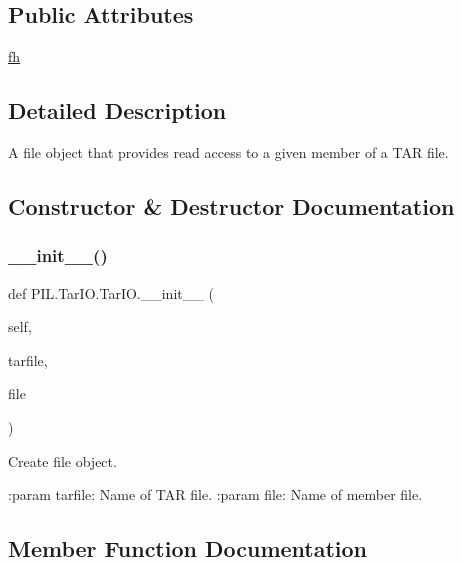 \subsection*{Public Attributes}
\begin{DoxyCompactItemize}
\item 
\hyperlink{classPIL_1_1TarIO_1_1TarIO_a380d15d8dec6c6aa52e5fe83da3d3832}{fh}
\end{DoxyCompactItemize}


\subsection{Detailed Description}
\begin{DoxyVerb}A file object that provides read access to a given member of a TAR file.\end{DoxyVerb}
 

\subsection{Constructor \& Destructor Documentation}
\mbox{\label{classPIL_1_1TarIO_1_1TarIO_aa4e263ae2b2cabc91dfc3672269d5fe8}} 
\subsubsection{\texorpdfstring{\+\_\+\+\_\+init\+\_\+\+\_\+()}{\_\_init\_\_()}}
{\footnotesize\ttfamily def P\+I\+L.\+Tar\+I\+O.\+Tar\+I\+O.\+\_\+\+\_\+init\+\_\+\+\_\+ (\begin{DoxyParamCaption}\item[{}]{self,  }\item[{}]{tarfile,  }\item[{}]{file }\end{DoxyParamCaption})}

\begin{DoxyVerb}Create file object.

:param tarfile: Name of TAR file.
:param file: Name of member file.
\end{DoxyVerb}
 

\subsection{Member Function Documentation}
\mbox{\label{classPIL_1_1TarIO_1_1TarIO_a33f82c2add29a666e94d162e1c0ef034}} 
